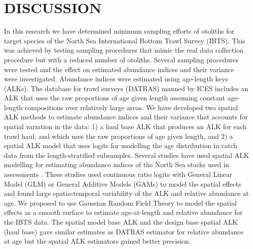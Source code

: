 \documentclass[a4paper 12pt]{article}
\numberwithin{equation}{section}
\begin{document}
%

\clearpage

\section{DISCUSSION}
\label{sec:discussion}
In this research we have determined minimum sampling efforts of otoliths for target species of the North Sea International Bottom Trawl Survey (IBTS). This was achieved by testing sampling procedures that mimic the real data collection procedure but with a reduced number of otoliths. Several sampling procedures were tested and the effect on estimated abundance indices and their variance were investigated. Abundance indices were estimated using age-length keys (ALKs). The database for trawl surveys (DATRAS) manned by ICES includes an ALK that uses the raw proportions of age given length assuming constant age-length compositions over relatively large areas. We have developed two spatial ALK methods  to estimate abundance indices and their variance that accounts for spatial variation in the data: 1) a haul base ALK that produces an ALK for each trawl haul, and which uses the raw proportions of age given length, and 2) a spatial ALK model that uses logits for modelling the age distribution in catch data from the length-stratified  subsamples. Several studies have used spatial ALK modelling for estimating abundance indices of the North Sea stocks used in  assessments \citep{berg2012spatial, berg2014evaluation, gerritsen2006simple}. These studies used continuous ratio logits with General Linear Model (GLM) or General Additive Models (GAMs) to model the spatial effects and found large spatio-temporal variability of the ALK and relative abundance at age. We proposed to use Gaussian Random Field Theory to model the spatial effects as a smooth surface to estimate age-at-length and relative abundance for the IBTS data. The spatial model base ALK and the design base spatial ALK (haul base) gave similar estimates as DATRAS estimator for relative abundance at age but the spatial ALK estimators gained better precision. 
\end{document}
